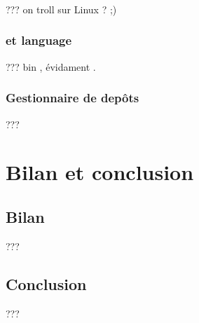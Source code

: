 \documentclass[french]{report}
\begin{document}
\subsection{\os}
??? on troll sur Linux ? ;) \linux{}
\subsection{\ide{} et language}
??? bin \java{}, évidament \eclipse{}.
\subsection{Gestionnaire de depôts}
??? \github




\chapter*{Bilan et conclusion}
\section*{Bilan}
???
\section*{Conclusion}
???


\end{document}
